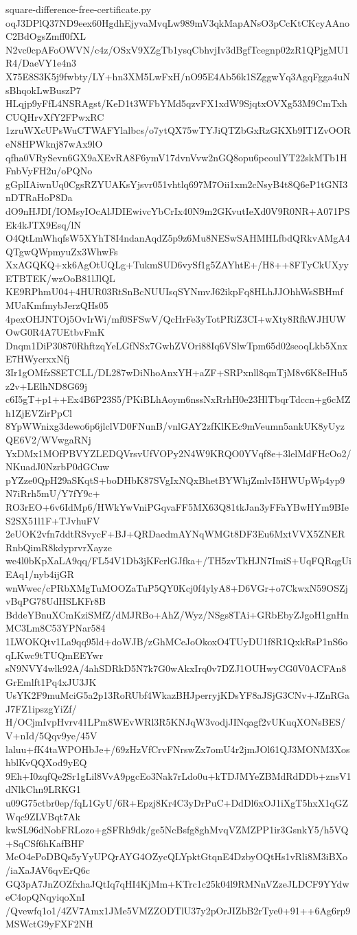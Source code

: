 \documentclass[11pt]{article}
\theoremstyle{definition}
\theoremstyle{remark}
\begin{document}
\begin{filecontents*}[overwrite]{square-difference-free-certificate.py}
oqJ3DPlQ37ND9eex60HgdhEjyvaMvqLw989mV3qkMapANsO3pCcKtCKcyAAnoC2BdOgsZmff0fXL
N2vc0cpAFoOWVN/c4z/OSxV9XZgTb1ysqCbhvjIv3dBgfTcegnp02zR1QPjgMU1R4/DaeVY1e4n3
X75E8S3K5j9fwbty/LY+hn3XM5LwFxH/nO95E4Ab56k1SZggwYq3AgqFgga4uNsBhqokLwBuszP7
HLqjp9yFfL4NSRAgst/KeD1t3WFbYMd5qzvFX1xdW9SjqtxOVXg53M9CmTxhCUQHrvXfY2FPwxRC
1zruWXcUPsWuCTWAFYlalbcs/o7ytQX75wTYJiQTZbGxRzGKXb9IT1ZvOOReN8HPWknj87wAx9lO
qfha0VRySevn6GX9aXEvRA8F6ymV17dvnVvw2nGQ8opu6pcoulYT22skMTb1HFnbVyFH2u/oPQNo
gGplIAiwnUq0CgsRZYUAKsYjsvr051vhtlq697M7Oii1xm2cNsyB4t8Q6eP1tGNI3nDTRaHoP8Da
dO9nHJDI/IOMsyIOcAlJDIEwivcYbCrIx40N9m2GKvutIeXd0V9R0NR+A071PSEk4kJTX9Esq/lN
O4QtLmWhqfsW5XYhT8I4ndanAqdZ5p9z6Mu8NESwSAHMHLfbdQRkvAMgA4QTgwQWpmyuZx3WhwFs
XxAGQKQ+xk6AgOtUQLg+TukmSUD6vySf1g5ZAYhtE+/H8++8FTyCkUXyyETBTEK/wzOoB81lJlQL
KE9RPhmU04+4HUR03RtSnBcNUUIsqSYNmvJ62ikpFq8HLhJJOhhWsSBHmfMUaKmfmybJerzQHs05
4pexOHJNTOj5OvIrWi/mf0SFSwV/QcHrFe3yTotPRiZ3CI+wXty8RfkWJHUWOwG0R4A7UEtbvFmK
Dnqm1DiP30870RhftzqYeLGfNSx7GwhZVOri88Iq6VSlwTpm65d02seoqLkb5XnxE7HWycrxxNfj
3Ir1gOMfzS8ETCLL/DL287wDiNhoAnxYH+aZF+SRPxnll8qmTjM8v6K8eIHu5z2v+LElhND8G69j
c6I5gT+p1++Ex4B6P23S5/PKiBLhAoym6nssNxRrhH0e23HlTbqrTdccn+g6cMZh1ZjEVZirPpCl
8YpWWnixg3dewo6p6jlclVD0FNunB/vnlGAY2zfKlKEc9mVeumn5ankUK8yUyzQE6V2/WVwgaRNj
YxDMx1MOfPBVYZLEDQVrsvUfVOPy2N4W9KRQO0YVqf8e+3lelMdFHcOo2/NKuadJ0NzrbP0dGCuw
pYZze0QpH29aSKqtS+boDHbK87SVgIxNQxBhetBYWhjZmlvI5HWUpWp4yp9N7iRrh5mU/Y7fY9c+
RO3rEO+6v6IdMp6/HWkYwVniPGqvaFF5MX63Q81tkJan3yFFaYBwHYm9BIeS2SX51l1F+TJvhuFV
2eUOK2vfn7ddtRSvycF+BJ+QRDaedmAYNqWMGt8DF3Eu6MxtVVX5ZNERRnbQimR8kdyprvrXayze
we4l0bKpXaLA9qq/FL54V1Db3jKFcrlGJfka+/TH5zvTkHJN7ImiS+UqFQRqgUiEAq1/nyb4ijGR
wnWwec/cPRbXMgTuMOOZaTuP5QY0Kcj0f4ylyA8+D6VGr+o7CkwxN59OSZjvBqPG78UdHSLKFr8B
BddeYBnuXCmKziSMfZ/dMJRBo+AhZ/Wyz/NSgs8TAi+GRbEbyZJgoH1gnHnMC3Lm8C53YPNar584
1LWOKQtv1La9qq95ld+doWJB/zGhMCeJoOkoxO4TUyDU1f8R1QxkRsP1nS6oqLKwc9tTUQmEEYwr
sN9NVY4wlk92A/4ahSDRkD5N7k7G0wAkxIrq0v7DZJ1OUHwyCG0V0ACFAn8GrEmlft1Pq4xJU3JK
UsYK2F9muMciG5a2p13RoRUbf4WkazBHJperryjKDsYF8aJSjG3CNv+JZnRGaJ7FZ1ipszgYiZf/
H/OCjmIvpHvrv41LPm8WEvWRl3R5KNJqW3vodjJINqagf2vUKuqXONsBES/V+nId/5Qqv9ye/45V
laluu+fK4taWPOHbJe+/69zHzVfCrvFNrswZx7omU4r2jmJOl61QJ3MONM3XoshblKvQQXod9yEQ
9Eh+I0zqfQe2Sr1gLil8VvA9pgcEo3Nak7rLdo0u+kTDJMYeZBMdRdDDb+znsV1dNlkChn9LRKG1
u09G75ctbr0ep/fqL1GyU/6R+Epzj8Kr4C3yDrPuC+DdDl6xOJ1iXgT5hxX1qGZWqc9ZLVBqt7Ak
kwSL96dNobFRLozo+gSFRh9dk/ge5NcBsfg8ghMvqVZMZPP1ir3GsnkY5/h5VQ+SqCSf6hKafBHF
McO4ePoDBQs5yYyUPQrAYG4OZycQLYpktGtqnE4DzbyOQtHs1vRli8M3iBXo/iaXaJAV6qvErQ6c
GQ3pA7JnZOZfxhaJQtIq7qHI4KjMm+KTrc1c25k04l9RMNnVZzeJLDCF9YYdweC4opQNqyiqoXnI
/Qvewfq1o1/4ZV7Amx1JMe5VMZZODTlU37y2pOrJIZbB2rTye0+91++6Ag6rp9MSWctG9yFXF2NH

\end{filecontents*}
\end{document}
